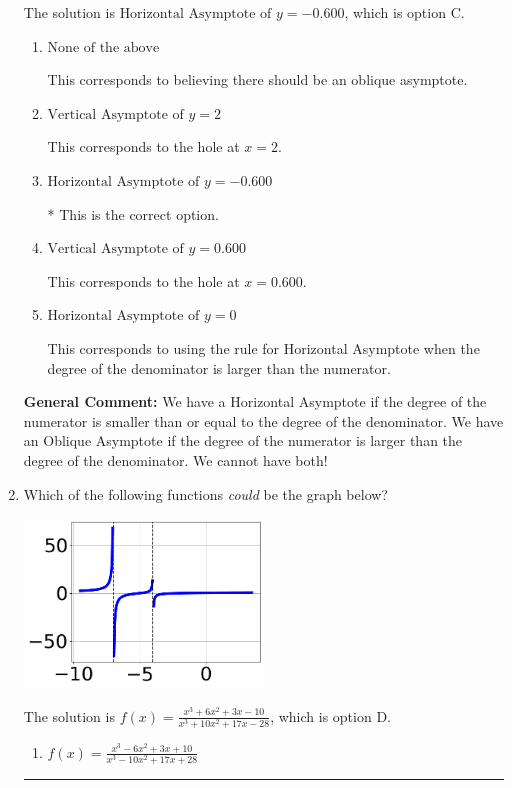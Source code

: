 \documentclass{extbook}[14pt]
\newcommand{\litem}[1]{\item #1

\rule{\textwidth}{0.4pt}}
\begin{document}
\begin{enumerate}
{The solution is \( \text{Horizontal Asymptote of } y = -0.600  \), which is option C.\begin{enumerate}[label=\Alph*.]
\item \( \text{None of the above} \)

This corresponds to believing there should be an oblique asymptote.
\item \( \text{Vertical Asymptote of } y = 2  \)

This corresponds to the hole at $x = 2$.
\item \( \text{Horizontal Asymptote of } y = -0.600  \)

* This is the correct option.
\item \( \text{Vertical Asymptote of } y = 0.600  \)

This corresponds to the hole at $x = 0.600$.
\item \( \text{Horizontal Asymptote of } y = 0  \)

This corresponds to using the rule for Horizontal Asymptote when the degree of the denominator is larger than the numerator.
\end{enumerate}

\textbf{General Comment:} We have a Horizontal Asymptote if the degree of the numerator is smaller than or equal to the degree of the denominator. We have an Oblique Asymptote if the degree of the numerator is larger than the degree of the denominator. We cannot have both!
}
\litem{
Which of the following functions \textit{could} be the graph below?

\begin{center}
    \includegraphics[width=0.5\textwidth]{../Figures/identifyGraphOfRationalFunctionCopyC.png}
\end{center}




The solution is \( f(x)=\frac{x^{3} +6 x^{2} +3 x -10}{x^{3} +10 x^{2} +17 x -28} \), which is option D.\begin{enumerate}[label=\Alph*.]
\item \( f(x)=\frac{x^{3} -6 x^{2} +3 x + 10}{x^{3} -10 x^{2} +17 x + 28} \)


\end{enumerate}}
\end{enumerate}
\end{document}
